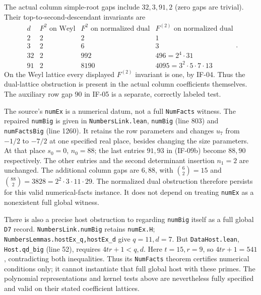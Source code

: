 The actual column simple-root gaps include $32,3,91,2$ (zero gaps are
trivial). Their top-to-second-descendant invariants are
\[
\begin{array}{c|c|c|c}
 d&F^2\text{ on Weyl}&F^2\text{ on normalized dual}
       &F^{(2)}\text{ on normalized dual}\\\hline
 2&2&2&1\\
 3&2&6&3\\
 32&2&992&496=2^4\cdot31\\
 91&2&8190&4095=3^2\cdot5\cdot7\cdot13
\end{array}.                                                   \tag{IF-09e}
\]
On the Weyl lattice every displayed $F^{(2)}$ invariant is one, by
IF-04. Thus the dual-lattice obstruction is present in the actual
column coefficients themselves. The auxiliary row gap $90$ in IF-05
is a separate, correctly labeled test.

The source's \texttt{numEx} is a numerical datum, not a full
\texttt{NumFacts} witness. The repaired \texttt{numBig} is given in
\texttt{NumbersLink.lean}, \texttt{numBig} (line 803) and
\texttt{numFactsBig} (line 1260). It retains the row parameters and
changes $u_7$ from $-1/2$ to $-7/2$ at one specified real place, besides
changing the size parameters. At that place $s_0=0$, $n_0=88$;
the last entries $91,93$ in (IF-09b) become $88,90$ respectively.
The other entries and the second determinant insertion $n_1=2$
are unchanged. The additional column gaps are $6,88$, with
$\binom62=15$ and $\binom{88}2=3828=2^2\cdot3\cdot11\cdot29$.
The normalized dual obstruction therefore persists for this valid
numerical-facts instance. It does not depend on treating
\texttt{numEx} as a nonexistent full global witness.

There is also a precise host obstruction to regarding
\texttt{numBig} itself as a full global \texttt{D7} record.
\texttt{NumbersLink.numBig} retains \texttt{numEx.H};
\texttt{NumbersLemmas.hostEx\_q,hostEx\_d} give $q=11,d=7$.
But \texttt{DataHost.lean}, \texttt{Host.qd\_big} (line 52), requires
$4tr+1<q,d$. Here $t=15,r=9$, so $4tr+1=541$, contradicting both
inequalities. Thus its \texttt{NumFacts} theorem certifies numerical
conditions only; it cannot instantiate that full global host with
these primes. The polynomial representations and kernel tests above
are nevertheless fully specified and valid on their stated coefficient
lattices.

